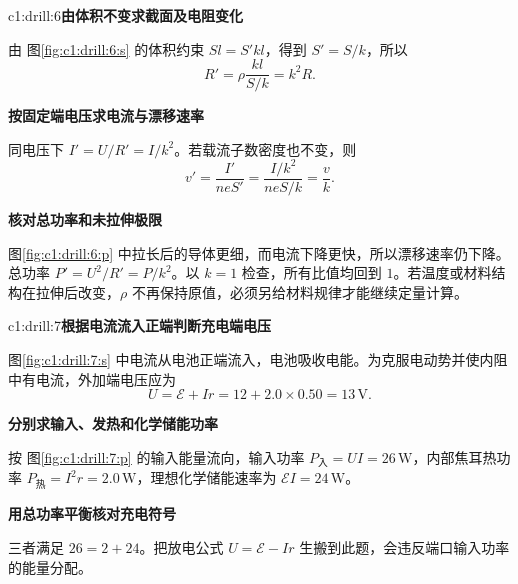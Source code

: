 \begin{drillsolution}{c1:drill:6}\textbf{由体积不变求截面及电阻变化}\par\nobreak
由 图\ref{fig:c1:drill:6:s} 的体积约束 $Sl=S'kl$，得到 $S'=S/k$，所以
\[
 R'=\rho\frac{kl}{S/k}=k^2R.
\]


\par\medskip{}\noindent\textbf{按固定端电压求电流与漂移速率}\par\nobreak
同电压下 $I'=U/R'=I/k^2$。若载流子数密度也不变，则
\[
 v'=\frac{I'}{neS'}=\frac{I/k^2}{neS/k}=\frac vk.
\]



\par\medskip{}\noindent\textbf{核对总功率和未拉伸极限}\par\nobreak
图\ref{fig:c1:drill:6:p} 中拉长后的导体更细，而电流下降更快，所以漂移速率仍下降。总功率 $P'=U^2/R'=P/k^2$。以 $k=1$ 检查，所有比值均回到 $1$。若温度或材料结构在拉伸后改变，$\rho$ 不再保持原值，必须另给材料规律才能继续定量计算。\end{drillsolution}
\begin{drillsolution}{c1:drill:7}\textbf{根据电流流入正端判断充电端电压}\par\nobreak
图\ref{fig:c1:drill:7:s} 中电流从电池正端流入，电池吸收电能。为克服电动势并使内阻中有电流，外加端电压应为
\[
 U=\mathcal E+Ir=12+2.0\times0.50=13\,\mathrm V.
\]



\par\medskip{}\noindent\textbf{分别求输入、发热和化学储能功率}\par\nobreak
按 图\ref{fig:c1:drill:7:p} 的输入能量流向，输入功率 $P_{\text{入}}=UI=26\,\mathrm W$，内部焦耳热功率 $P_{\text{热}}=I^2r=2.0\,\mathrm W$，理想化学储能速率为 $\mathcal EI=24\,\mathrm W$。

\par\medskip{}\noindent\textbf{用总功率平衡核对充电符号}\par\nobreak
三者满足 $26=2+24$。把放电公式 $U=\mathcal E-Ir$ 生搬到此题，会违反端口输入功率的能量分配。\end{drillsolution}
